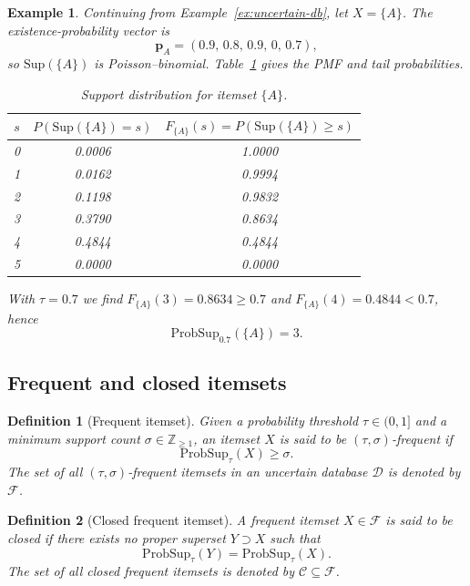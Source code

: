 \documentclass[10pt,letterpaper]{article}
\newtheorem{definition}{Definition}[section]
\newtheorem{example}{Example}[section]
\newcounter{definition}
\newcounter{example}
\begin{document}
\begin{example}
\label{ex:probA}
Continuing from Example~\ref{ex:uncertain-db}, let $X=\{A\}$. The existence-probability vector is
\[
\mathbf{p}_A = (0.9,\,0.8,\,0.9,\,0,\,0.7),
\]
so $\mathrm{Sup}(\{A\})$ is Poisson--binomial. Table~\ref{tab:support_dist_A} gives the PMF and tail probabilities.

\begin{table}[H]
\caption{Support distribution for itemset $\{A\}$.}
\label{tab:support_dist_A}
\centering
\begin{tabular}{c c c}
\hline
$s$ & $P(\mathrm{Sup}(\{A\})=s)$ & $F_{\{A\}}(s)=P(\mathrm{Sup}(\{A\})\ge s)$ \\
\hline
0 & 0.0006 & 1.0000 \\
1 & 0.0162 & 0.9994 \\
2 & 0.1198 & 0.9832 \\
3 & 0.3790 & 0.8634 \\
4 & 0.4844 & 0.4844 \\
5 & 0.0000 & 0.0000 \\
\hline
\end{tabular}
\end{table}

With $\tau=0.7$ we find $F_{\{A\}}(3)=0.8634\ge0.7$ and $F_{\{A\}}(4)=0.4844<0.7$, hence
\[
\mathrm{ProbSup}_{0.7}(\{A\}) = 3.
\]
\end{example}

\subsection*{Frequent and closed itemsets}
\label{subsec:freq_closed}

\begin{definition}[Frequent itemset]
\label{def:frequent}
Given a probability threshold $\tau \in (0,1]$ and a minimum support count $\sigma \in \mathbb{Z}_{\geq 1}$, an itemset $X$ is said to be $(\tau,\sigma)$-frequent if
\begin{equation}
\mathrm{ProbSup}_{\tau}(X) \geq \sigma .
\label{eq:freq_def}
\end{equation}
The set of all $(\tau,\sigma)$-frequent itemsets in an uncertain database $\mathcal{D}$ is denoted by $\mathcal{F}$.
\end{definition}

\begin{definition}[Closed frequent itemset]
\label{def:closed}
A frequent itemset $X \in \mathcal{F}$ is said to be \emph{closed} if there exists no proper superset $Y \supset X$ such that
\begin{equation}
\mathrm{ProbSup}_{\tau}(Y) = \mathrm{ProbSup}_{\tau}(X).
\label{eq:closed_def}
\end{equation}
The set of all closed frequent itemsets is denoted by $\mathcal{C} \subseteq \mathcal{F}$.
\end{definition}
\end{document}
